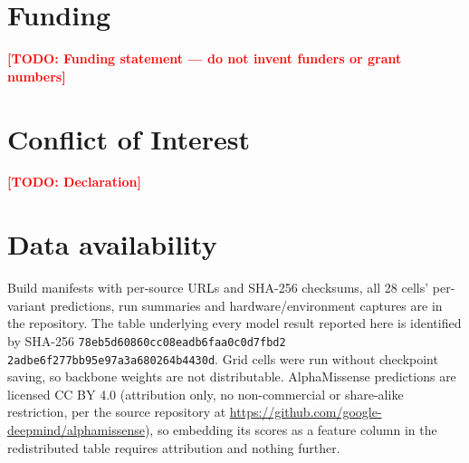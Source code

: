 \documentclass{bioinfo}
\newcommand{\todo}[1]{\textcolor{red}{\textbf{[TODO: #1]}}}
\begin{document}
\section*{Funding}
\todo{Funding statement --- do not invent funders or grant numbers}

\section*{Conflict of Interest}
\todo{Declaration}

\section*{Data availability}
Build manifests with per-source URLs and SHA-256 checksums, all 28 cells'
per-variant predictions, run summaries and hardware/environment captures are in
the repository. The table underlying every model result reported here is
identified by SHA-256
\texttt{78eb5d60860cc08e\allowbreak adb6faa0c0d7fbd2\allowbreak
2adbe6f277bb95e9\allowbreak 7a3a680264b4430d}. Grid
cells were run without checkpoint saving, so backbone weights are not
distributable. AlphaMissense predictions are licensed CC BY 4.0 (attribution
only, no non-commercial or share-alike restriction, per the source repository
at \url{https://github.com/google-deepmind/alphamissense}), so embedding its
scores as a feature column in the redistributed table requires attribution
and nothing further.



\end{document}
